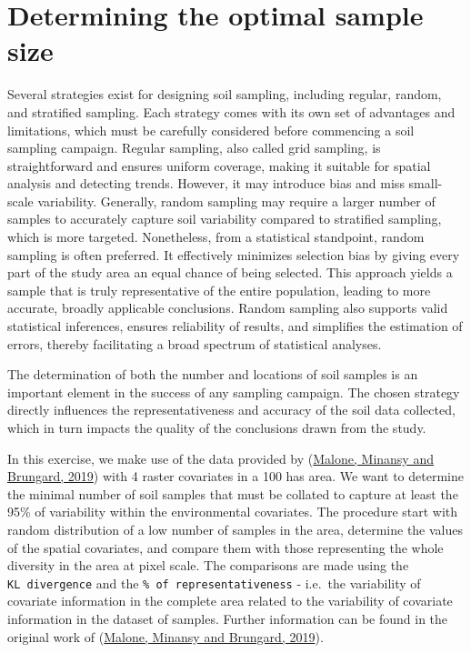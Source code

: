 \documentclass[
]{book}
\begin{document}
\hypertarget{determining-the-optimal-sample-size}{%
\section{Determining the optimal sample size}\label{determining-the-optimal-sample-size}}

Several strategies exist for designing soil sampling, including regular, random, and stratified sampling. Each strategy comes with its own set of advantages and limitations, which must be carefully considered before commencing a soil sampling campaign. Regular sampling, also called grid sampling, is straightforward and ensures uniform coverage, making it suitable for spatial analysis and detecting trends. However, it may introduce bias and miss small-scale variability. Generally, random sampling may require a larger number of samples to accurately capture soil variability compared to stratified sampling, which is more targeted. Nonetheless, from a statistical standpoint, random sampling is often preferred. It effectively minimizes selection bias by giving every part of the study area an equal chance of being selected. This approach yields a sample that is truly representative of the entire population, leading to more accurate, broadly applicable conclusions. Random sampling also supports valid statistical inferences, ensures reliability of results, and simplifies the estimation of errors, thereby facilitating a broad spectrum of statistical analyses.

The determination of both the number and locations of soil samples is an important element in the success of any sampling campaign. The chosen strategy directly influences the representativeness and accuracy of the soil data collected, which in turn impacts the quality of the conclusions drawn from the study.

In this exercise, we make use of the data provided by (\protect\hyperlink{ref-Malone}{Malone, Minansy and Brungard, 2019}) with 4 raster covariates in a 100 has area. We want to determine the minimal number of soil samples that must be collated to capture at least the 95\% of variability within the environmental covariates. The procedure start with random distribution of a low number of samples in the area, determine the values of the spatial covariates, and compare them with those representing the whole diversity in the area at pixel scale. The comparisons are made using the \texttt{\textquotesingle{}KL\ divergence\textquotesingle{}} and the \texttt{\textquotesingle{}\%\ of\ representativeness\textquotesingle{}} - i.e.~the variability of covariate information in the complete area related to the variability of covariate information in the dataset of samples. Further information can be found in the original work of (\protect\hyperlink{ref-Malone}{Malone, Minansy and Brungard, 2019}).
\end{document}
